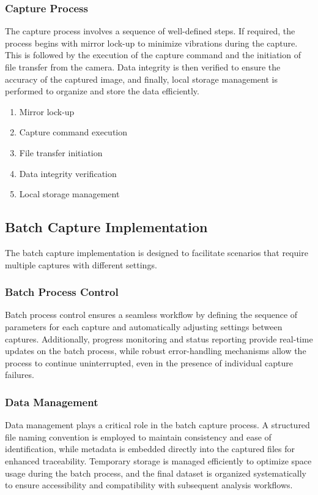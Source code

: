 \subsubsection{Capture Process}

The capture process involves a sequence of well-defined steps. If required, the process begins with mirror lock-up to minimize vibrations during the capture. This is followed by the execution of the capture command and the initiation of file transfer from the camera. Data integrity is then verified to ensure the accuracy of the captured image, and finally, local storage management is performed to organize and store the data efficiently.

\begin{enumerate}
    \item Mirror lock-up
    \item Capture command execution
    \item File transfer initiation
    \item Data integrity verification
    \item Local storage management
\end{enumerate}

\subsection{Batch Capture Implementation}
The batch capture implementation is designed to facilitate scenarios that require multiple captures with different settings.

\subsubsection{Batch Process Control}
 Batch process control ensures a seamless workflow by defining the sequence of parameters for each capture and automatically adjusting settings between captures. Additionally, progress monitoring and status reporting provide real-time updates on the batch process, while robust error-handling mechanisms allow the process to continue uninterrupted, even in the presence of individual capture failures.

\subsubsection{Data Management}
Data management plays a critical role in the batch capture process. A structured file naming convention is employed to maintain consistency and ease of identification, while metadata is embedded directly into the captured files for enhanced traceability. Temporary storage is managed efficiently to optimize space usage during the batch process, and the final dataset is organized systematically to ensure accessibility and compatibility with subsequent analysis workflows.

